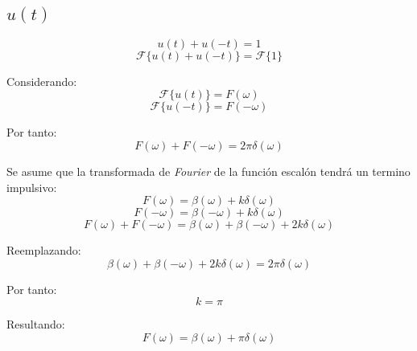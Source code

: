\subsection{$u(t)$}
\begin{equation*}
    u(t)+u(-t)=1
\end{equation*}
\begin{equation*}
    \mathcal{F}\{u(t)+u(-t)\}=\mathcal{F}\{1\}
\end{equation*}

Considerando:
\begin{equation*}
    \mathcal{F}\{u(t)\}=F(\omega)
\end{equation*}
\begin{equation*}
    \mathcal{F}\{u(-t)\}=F(-\omega)
\end{equation*}

Por tanto:
\begin{equation*}
    F(\omega)+F(-\omega)=2\pi\delta(\omega)
\end{equation*}

Se asume que la transformada de \emph{Fourier} de la función escalón tendrá un
termino impulsivo:
\begin{equation*}
    F(\omega)=\beta(\omega)+k\delta(\omega)
\end{equation*}
\begin{equation*}
    F(-\omega)=\beta(-\omega)+k\delta(\omega)
\end{equation*}
\begin{equation*}
    F(\omega)+F(-\omega)=\beta(\omega)+\beta(-\omega)+2k\delta(\omega)
\end{equation*}

Reemplazando:
\begin{equation*}
    \beta(\omega)+\beta(-\omega)+2k\delta(\omega)=2\pi\delta(\omega)
\end{equation*}

Por tanto:
\begin{equation*}
    k=\pi
\end{equation*}

Resultando:
\begin{equation*}
    F(\omega)=\beta(\omega)+\pi\delta(\omega)
\end{equation*}

